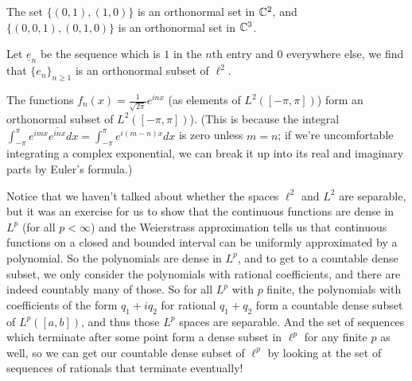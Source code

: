 \begin{example}
The set $\{(0, 1), (1, 0)\}$ is an orthonormal set in $\mathbb C^2$, and $\{(0, 0, 1), (0, 1, 0)\}$ is an orthonormal set in $\mathbb C^3$. 
\end{example}

\begin{example}
Let $\underline{e}_n$ be the sequence which is $1$ in the $n$th entry and $0$ everywhere else, we find that $\{e_n\}_{n \ge 1}$ is an orthonormal subset of $\ell^2$.
\end{example}

\begin{example}
The functions $f_n(x) = \frac{1}{\sqrt{2\pi}} e^{inx}$ (as elements of $L^2([-\pi, \pi])$) form an orthonormal subset of $L^2([-\pi, \pi])$). (This is because the integral $\int_{-\pi}^{\pi} e^{imx} \overline{e^{inx}} dx = \int_{-\pi}^{\pi} e^{i(m-n)x} dx$ is zero unless $m = n$; if we're uncomfortable integrating a complex exponential, we can break it up into its real and imaginary parts by Euler's formula.)
\end{example}

Notice that we haven't talked about whether the spaces $\ell^2$ and $L^2$ are separable, but it was an exercise for us to show that the continuous functions are dense in $L^p$ (for all $p < \infty$) and the Weierstrass approximation tells us that continuous functions on a closed and bounded interval can be uniformly approximated by a polynomial. So the polynomials are dense in $L^p$, and to get to a countable dense subset, we only consider the polynomials with rational coefficients, and there are indeed countably many of those. So for all $L^p$ with $p$ finite, the polynomials with coefficients of the form $q_1 + i q_2$ for rational $q_1 + q_2$ form a countable dense subset of $L^p([a, b])$, and thus those $L^p$ spaces are separable. And the set of sequences which terminate after some point form a dense subset in $\ell^p$ for any finite $p$ as well, so we can get our countable dense subset of $\ell^p$ by looking at the set of sequences of rationals that terminate eventually!

